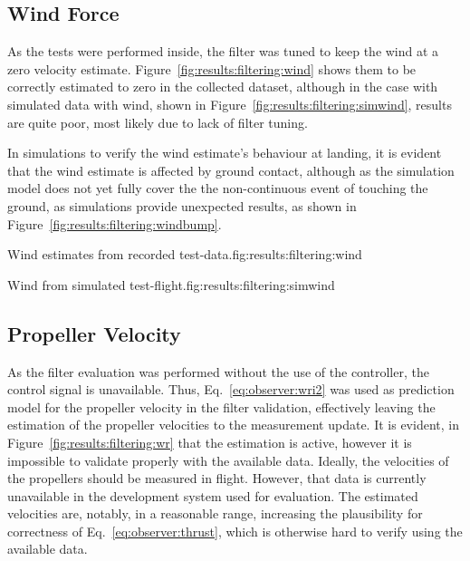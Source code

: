 \subsection{Wind Force}
    As the tests were performed inside, the filter was tuned to keep the
    wind at a zero velocity estimate.
    Figure~\ref{fig:results:filtering:wind} shows them to be correctly estimated to zero in the collected dataset,
    although in the case with simulated data with wind, shown in Figure~\ref{fig:results:filtering:simwind},
    results are quite poor, most likely due to lack of filter tuning.

    In simulations to verify the wind estimate's behaviour at landing, it
    is evident that the wind estimate is affected by ground contact,
    although as the simulation model does not yet fully cover the the non-continuous
    event of touching the ground, as simulations provide unexpected results, as shown in
    Figure~\ref{fig:results:filtering:windbump}.

    \begin{subfigures}{Wind estimates from recorded test-data.}{fig:results:filtering:wind}
    \end{subfigures}

    \begin{subfigures}{Wind from simulated test-flight.}{fig:results:filtering:simwind}
    \end{subfigures}


\subsection{Propeller Velocity}
    As the filter evaluation was performed without the use of the controller,
    the control signal is unavailable. Thus, Eq.~\eqref{eq:observer:wri2} was used as
    prediction model for the propeller velocity in the filter validation, effectively leaving the estimation of the propeller velocities
    to the measurement update. It is evident, in Figure~\ref{fig:results:filtering:wr}
    that the estimation is active, however it is impossible to validate properly with the available data.
    Ideally, the velocities of the propellers should be measured in flight.
    However, that data is currently unavailable in the development system used for evaluation.
    The estimated velocities are, notably, in a reasonable range,
    increasing the plausibility for correctness of Eq.~\eqref{eq:observer:thrust}, which is
    otherwise hard to verify using the available data.

